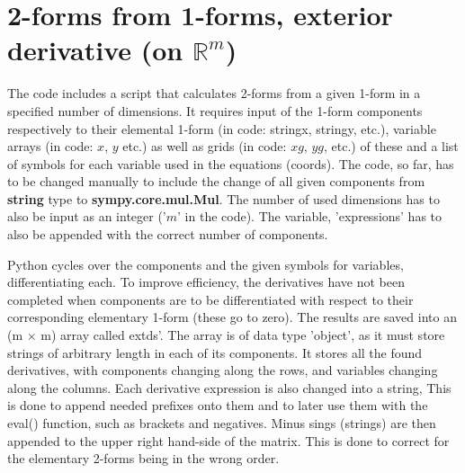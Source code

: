 \documentclass[11]{report}
\begin{document}
\section{2-forms from 1-forms, exterior derivative (on $\mathbb{R}^{m}$)}
The code includes a script that calculates 2-forms from a given 1-form in a specified number of dimensions.
It requires input of the 1-form components respectively to their elemental 1-form (in code: string\textunderscore x, string\textunderscore y, etc.), variable arrays (in code: $x$, $y$ etc.) as well as grids (in code: $xg$, $yg$, etc.) of these and a list of symbols for each variable used in the equations (coords).
The code, so far, has to be changed manually to include the change of all given components from \textbf{string} type to \textbf{sympy.core.mul.Mul}. The number of used dimensions has to also be input as an integer ('$m$' in the code). The variable, 'expressions' has to also be appended with the correct number of components.

\noindent Python cycles over the components and the given symbols for variables, differentiating each. To improve efficiency, the derivatives have not been completed when components are to be differentiated with respect to their corresponding elementary 1-form (these go to zero). The results are saved into an (m $\times$ m) array called ext\textunderscore ds'. The array is of data type 'object', as it must store strings of arbitrary length in each of its components. It stores all the found derivatives, with components changing along the rows, and variables changing along the columns.
Each derivative expression is also changed into a string, This is done to append needed prefixes onto them and to later use them with the eval() function, such as brackets and negatives. Minus sings (strings) are then appended to the upper right hand-side of the matrix. This is done to correct for the elementary 2-forms being in the wrong order.
\end{document}
